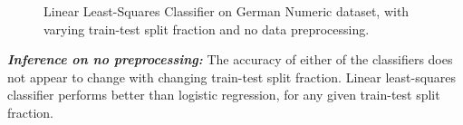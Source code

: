 \documentclass[12pt, a4 paper]{article}
\begin{document}
\begin{figure}

\caption{Linear Least-Squares Classifier on German Numeric dataset, with varying train-test split fraction and no data preprocessing.}
\label{fig:german_none}
\end{figure}

{\it \bfseries Inference on no preprocessing:} The accuracy of either of the classifiers does not appear to change with changing train-test split fraction. Linear least-squares classifier performs better than logistic regression, for any given train-test split fraction. \\
\end{document}

